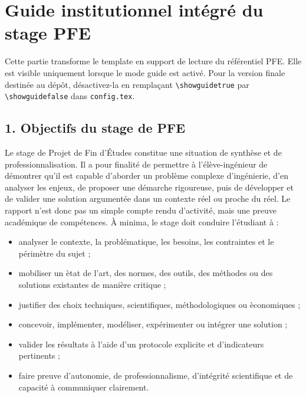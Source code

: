 \chapter*{Guide institutionnel int\'egr\'e du stage PFE}

\begin{guidebox}
Cette partie transforme le template en support de lecture du r\'ef\'erentiel PFE. Elle est visible uniquement lorsque le mode guide est activ\'e. Pour la version finale destin\'ee au d\'ep\^ot, d\'esactivez-la en rempla\c{c}ant \texttt{\textbackslash showguidetrue} par \texttt{\textbackslash showguidefalse} dans \texttt{config.tex}.
\end{guidebox}

\section*{1. Objectifs du stage de PFE}

Le stage de Projet de Fin d'\'Etudes constitue une situation de synth\`ese et de professionnalisation. Il a pour finalit\'e de permettre \`a l'\'el\`eve-ing\'enieur de d\'emontrer qu'il est capable d'aborder un probl\`eme complexe d'ing\'enierie, d'en analyser les enjeux, de proposer une d\'emarche rigoureuse, puis de d\'evelopper et de valider une solution argument\'ee dans un contexte r\'eel ou proche du r\'eel. Le rapport n'est donc pas un simple compte rendu d'activit\'e, mais une preuve acad\'emique de comp\'etences. \`A minima, le stage doit conduire l'\'etudiant \`a :

\begin{itemize}[leftmargin=1.2cm]
\item analyser le contexte, la probl\'ematique, les besoins, les contraintes et le p\'erim\`etre du sujet ;
\item mobiliser un \`etat de l'art, des normes, des outils, des m\'ethodes ou des solutions existantes de mani\`ere critique ;
\item justifier des choix techniques, scientifiques, m\'ethodologiques ou \`economiques ;
\item concevoir, impl\'ementer, mod\'eliser, exp\'erimenter ou int\'egrer une solution ;
\item valider les r\'esultats \`a l'aide d'un protocole explicite et d'indicateurs pertinents ;
\item faire preuve d'autonomie, de professionnalisme, d'int\'egrit\'e scientifique et de capacit\'e \`a communiquer clairement.
\end{itemize}

